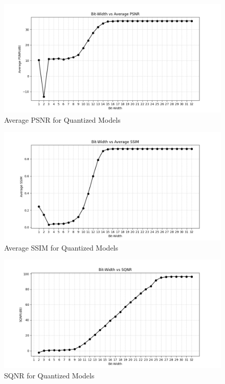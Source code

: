     \begin{figure}[H]
        \centering
        \includegraphics[height=0.4\textwidth]{assets/quantization/psnr.png}
        \caption{Average PSNR for Quantized Models}
        \label{fig:psnr-plot}
    \end{figure}

    \begin{figure}[H]
        \centering
        \includegraphics[height=0.4\textwidth]{assets/quantization/ssim.png}
        \caption{Average SSIM for Quantized Models}
        \label{fig:ssim-plot}
    \end{figure}

    \begin{figure}[H]
        \centering
        \includegraphics[height=0.4\textwidth]{assets/quantization/sqnr.png}
        \caption{SQNR for Quantized Models}
        \label{fig:sqnr-plot}
    \end{figure}

